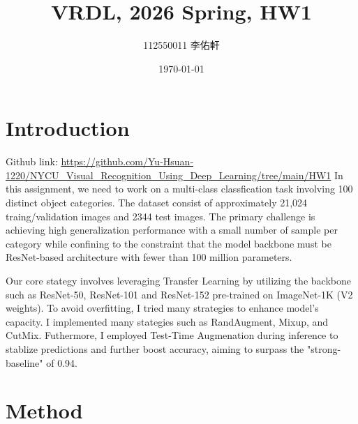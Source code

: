\documentclass[a4paper, twocolumn]{article} %
\title{VRDL, 2026 Spring, HW1}
\author{112550011 李佑軒}
\date{\today}
\begin{document}
\maketitle %

\section{Introduction}
Github link: \url{https://github.com/Yu-Hsuan-1220/NYCU_Visual_Recognition_Using_Deep_Learning/tree/main/HW1}
In this assignment, we need to work on a multi-class classfication task involving 100 distinct object categories.
The dataset consist of approximately 21,024 traing/validation images and 2344 test images. 
The primary challenge is achieving high generalization performance with a small number of sample per category
while confining to the constraint that the model backbone must be ResNet-based architecture with fewer than 100 million parameters.

Our core stategy involves leveraging Transfer Learning by utilizing the backbone such as ResNet-50, ResNet-101 and ResNet-152
pre-trained on ImageNet-1K (V2 weights). To avoid overfitting, I tried many strategies to enhance model's capacity.
I implemented many stategies such as RandAugment, Mixup, and CutMix. Futhermore, I employed Test-Time Augmenation during inference to stablize predictions
and further boost accuracy, aiming to surpass the "strong-baseline" of 0.94.

\section{Method}
\end{document}
